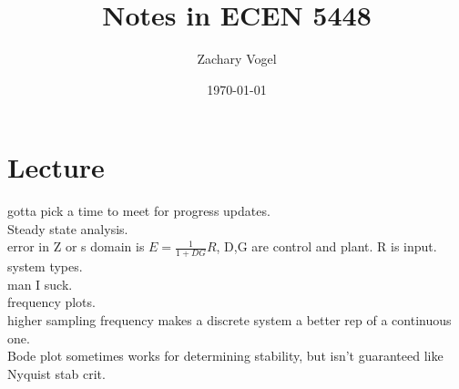 \documentclass{article}
\author{Zachary Vogel}
\date{\today}
\title{Notes in ECEN 5448}
\begin{document}
\maketitle


\section*{Lecture}
gotta pick a time to meet for progress updates.\\

Steady state analysis.\\

error in Z or s domain is $E=\frac{1}{1+DG}R$, D,G are control and plant. R is input.\\

system types.\\

man I suck.\\

frequency plots.\\

higher sampling frequency makes a discrete system a better rep of a continuous one.\\

Bode plot sometimes works for determining stability, but isn't guaranteed like Nyquist stab crit.
\end{document}
